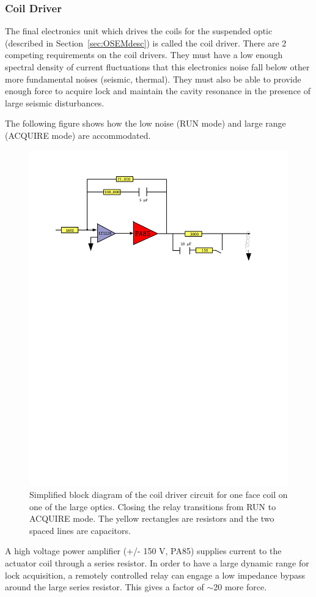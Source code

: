 \subsubsection{Coil Driver}
\label{sec:CoilDriver}
The final electronics unit which drives the coils for the suspended optic
(described in Section~\ref{sec:OSEMdesc}) is called the coil driver.
There are 2 competing requirements on the coil drivers. They must have
a low enough spectral density of current fluctuations that this electronics
noise fall below other more fundamental noises (seismic, thermal). They
must also be able to provide enough force to acquire lock and maintain the
cavity resonance in the presence of large seismic disturbances.

The following figure shows how the low noise ({RUN} mode) and large range
{(ACQUIRE} mode) are accommodated.

\begin{figure}[!h]
\centerline{
\includegraphics[angle=0,width=6.5in]{Figures/Chap4/coildriver.pdf}}
\caption[Coil Driver]{Simplified block diagram of the coil driver
         circuit for one face coil on one of the large optics. Closing
         the relay transitions from {RUN} to {ACQUIRE} mode. The yellow
         rectangles are resistors and the two spaced lines are capacitors.}
\end{figure}
A high voltage power amplifier (+/- 150 V, PA85) supplies current to the actuator coil
through a series resistor. In order to have a large dynamic range for lock
acquisition, a remotely controlled relay can engage a low impedance bypass
around the large series resistor. This gives a factor of $\sim$20 more force.


